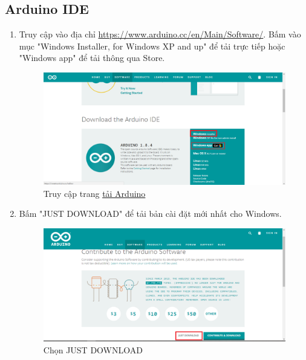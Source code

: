 \subsection{Arduino IDE}
\begin{enumerate}
\item Truy cập vào địa chỉ \href{https://www.arduino.cc/en/Main/Software/}{https://www.arduino.cc/en/Main/Software/}. Bấm vào mục "Windows Installer, for Windows XP and up" để tải trực tiếp hoặc "Windows app" để tải thông qua Store.
\begin{center}
\begin{figure}[htp]
\begin{center}
\includegraphics[scale=0.33]{image4/arduino1.png}
\end{center}
\caption{Truy cập trang \href{https://www.arduino.cc/en/Main/Software/}{tải Arduino}}
\end{figure}
\end{center}
\item Bấm "JUST DOWNLOAD" để tải bản cài đặt mới nhất cho Windows.
\begin{center}
\begin{figure}[htp]
\begin{center}
\includegraphics[scale=0.33]{image4/arduino2.png}
\end{center}
\caption{Chọn JUST DOWNLOAD}

\end{figure}
\end{center}
\end{enumerate}
